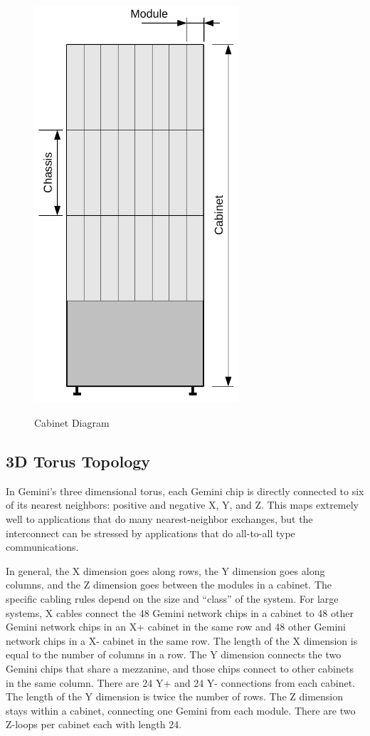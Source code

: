 \documentclass[10pt, conference, compsocconf]{IEEEtran}
\begin{document}
\begin{figure}
  \centering
  \includegraphics[width=3.0in]{figures/cabinet_diagram.pdf}\\
  \caption{Cabinet Diagram}\label{fig:cab}
\end{figure}

\subsection{3D Torus Topology}

\label{sec:torustopo}
In Gemini's three dimensional torus, each Gemini chip is directly connected to
six of its nearest neighbors: positive and negative X, Y, and Z.  This maps
extremely well to applications that do many nearest-neighbor exchanges, but the
interconnect can be stressed by applications that do all-to-all type
communications.

In general, the X dimension goes along rows, the Y dimension goes along
columns, and the Z dimension goes between the modules in a cabinet.  The
specific cabling rules depend on the size and ``class'' of the system.  For
large systems, X cables connect the 48 Gemini network chips in a cabinet to 48
other Gemini network chips in an X+ cabinet in the same row and 48 other Gemini
network chips in a X- cabinet in the same row.  The length of the X dimension
is equal to the number of columns in a row.  The Y dimension connects the two
Gemini chips that share a mezzanine, and those chips connect to other cabinets
in the same column.  There are 24 Y+ and 24 Y- connections from each cabinet.
The length of the Y dimension is twice the number of rows.  The Z dimension
stays within a cabinet, connecting one Gemini from each module.  There are two
Z-loops per cabinet each with length 24.
\end{document}
